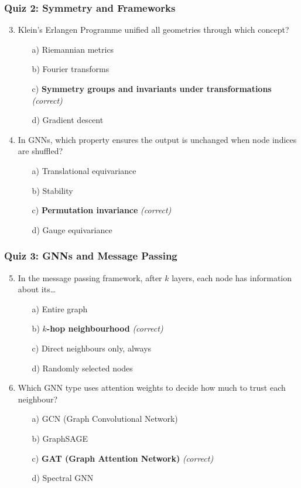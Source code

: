 \begin{frame}[fragile]\frametitle{Quiz 2: Symmetry and Frameworks}
  \begin{enumerate}
    \setcounter{enumi}{2}
    \item Klein's Erlangen Programme unified all geometries through which concept?
      \begin{itemize}
        \item[a)] Riemannian metrics
        \item[b)] Fourier transforms
        \item[c)] \textbf{Symmetry groups and invariants under transformations} \textit{(correct)}
        \item[d)] Gradient descent
      \end{itemize}
    \vspace{0.4cm}
    \item In GNNs, which property ensures the output is unchanged when node indices are shuffled?
      \begin{itemize}
        \item[a)] Translational equivariance
        \item[b)] Stability
        \item[c)] \textbf{Permutation invariance} \textit{(correct)}
        \item[d)] Gauge equivariance
      \end{itemize}
  \end{enumerate}
\end{frame}

\begin{frame}[fragile]\frametitle{Quiz 3: GNNs and Message Passing}
  \begin{enumerate}
    \setcounter{enumi}{4}
    \item In the message passing framework, after $k$ layers, each node has information about its\ldots
      \begin{itemize}
        \item[a)] Entire graph
        \item[b)] \textbf{$k$-hop neighbourhood} \textit{(correct)}
        \item[c)] Direct neighbours only, always
        \item[d)] Randomly selected nodes
      \end{itemize}
    \vspace{0.4cm}
    \item Which GNN type uses attention weights to decide how much to trust each neighbour?
      \begin{itemize}
        \item[a)] GCN (Graph Convolutional Network)
        \item[b)] GraphSAGE
        \item[c)] \textbf{GAT (Graph Attention Network)} \textit{(correct)}
        \item[d)] Spectral GNN
      \end{itemize}
  \end{enumerate}
\end{frame}

